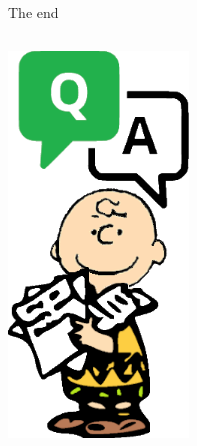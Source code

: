 \begin{frame}{The end}
	\begin{columns}
		\begin{column}{0.5\textwidth}
			\begin{center}
				\includegraphics[width=0.5\textwidth]{img/QandA_charlie2}
			\end{center}
		\end{column}
		\begin{column}{0.5\textwidth}
			\begin{center}
			\end{center}
		\end{column}
	\end{columns}
\end{frame}